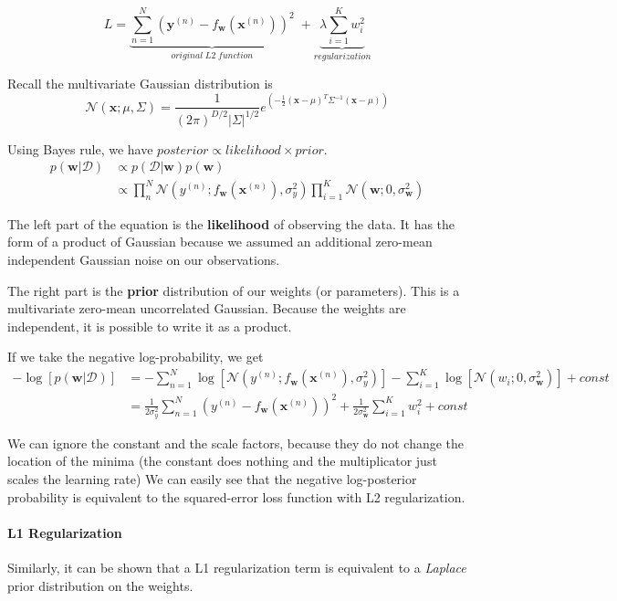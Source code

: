 \begin{equation}
L = \underbrace{\sum_{n=1}^N (\mathbf{y}^{(n)}-f_\mathbf{w}(\mathbf{x}^{(n)}))^2}_{original\;L2\;function} \;+ \underbrace{\lambda \sum_{i=1}^{K} w_i^2}_{regularization}
\end{equation}

Recall the multivariate Gaussian distribution is
\begin{equation}
    \mathcal{N}(\mathbf{x}; \mu, \Sigma) = \frac{1}{(2\pi)^{D/2} |\Sigma|^{1/2}} e^{\left(-\frac{1}{2} (\mathbf{x}-\mu)^T \Sigma^{-1}(\mathbf{x}-\mu)\right)}
\end{equation}

Using Bayes rule, we have $posterior \propto likelihood \times prior$.
\begin{align}
    p(\mathbf{w}|\mathcal{D}) & \propto p(\mathcal{D}|\mathbf{w}) p(\mathbf{w}) \\
     & \propto \prod_n^N \mathcal{N}(y^{(n)}; f_\mathbf{w}(\mathbf{x}^{(n)}), \sigma_y^2) \prod_{i=1}^K \mathcal{N}(\mathbf{w}; 0, \sigma_\mathbf{w}^2)
\end{align}

The left part of the equation is the \textbf{likelihood} of observing the data. It has the form of a product of Gaussian because we assumed an additional zero-mean independent Gaussian noise on our observations.

The right part is the \textbf{prior} distribution of our weights (or parameters). This is a multivariate zero-mean uncorrelated Gaussian. Because the weights are independent, it is possible to write it as a product.

If we take the negative log-probability, we get
\begin{align}
    -\log[p(\mathbf{w}|\mathcal{D})] & = -\sum_ {n=1}^{N} \log[\mathcal{N}(y^{(n)}; f_{\mathbf{w}}(\mathbf{x}^{(n)}), \sigma_y^2)] - \sum_{i=1}^K \log[\mathcal{N}(w_i; 0, \sigma_{\mathbf{w}}^2)] + const \\
    & = \frac{1}{2\sigma_y^2} \sum_{n=1}^N (y^{(n)} - f_{\mathbf{w}}(\mathbf{x}^{(n)}))^2 + \frac{1}{2\sigma_{\mathbf{w}}^2} \sum_{i=1}^K w_i^2 + const
\end{align}

We can ignore the constant and the scale factors, because they do not change the location of the minima (the constant does nothing and the multiplicator just scales the learning rate)
We can easily see that the negative log-posterior probability is equivalent to the squared-error loss function with L2 regularization.

\paragraph{L1 Regularization}
Similarly, it can be shown that a L1 regularization term is equivalent to a \textit{Laplace} prior distribution on the weights.